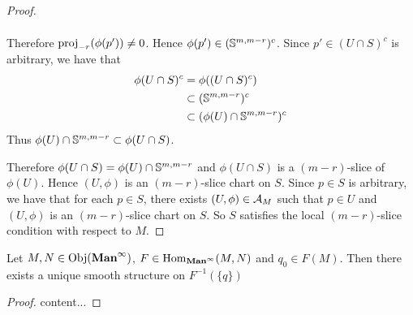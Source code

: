 \documentclass{book}
\begin{document}
\begin{proof}
\begin{itemize}
\begin{align*}
			\end{align*}
			Therefore $\prj_{-r}(\phi(p')) \neq 0$. Hence $\phi(p') \in (\S^{m, m-r})^c$. Since $p' \in (U \cap S)^c$ is arbitrary, we have that 
			\begin{align*}
				\phi(U \cap S)^c
				& = \phi((U \cap S)^c) \\
				& \subset (\S^{m, m-r})^c \\
				& \subset (\phi(U) \cap \S^{m, m-r})^c
			\end{align*}
			Thus $\phi(U) \cap \S^{m, m-r} \subset \phi(U \cap S)$. 
		\end{itemize}
		Therefore $\phi(U \cap S) = \phi(U) \cap \S^{m, m-r}$ and $\phi(U \cap S)$ is a $(m-r)$-slice of $\phi(U)$. Hence $(U, \phi)$ is an $(m-r)$-slice chart on $S$. Since $p \in S$ is arbitrary, we have that for each $p \in S$, there exists $(U, \phi) \in \MA_M$ such that $p \in U$ and $(U, \phi)$ is an $(m-r)$-slice chart on $S$. So $S$ satisfies the local $(m-r)$-slice condition with respect to $M$.  
	\end{proof}
	
	\begin{ex}
		 Let $M, N \in \Obj(\Maninf)$, $F \in \Hom_{\Maninf}(M,N)$ and $q_0 \in F(M)$. Then there exists a unique smooth structure on $F^{-1}(\{q\})$ 
	\end{ex}

	\begin{proof}
		content...
	\end{proof}
	
	
	
	
	\begin{ex}
		
	\end{ex}
	
	
	
	
	
	
	






	
	
	
	
	
	
	
	
	
	
	
	
	
	
	
	
	
	
	
	
\end{document}
